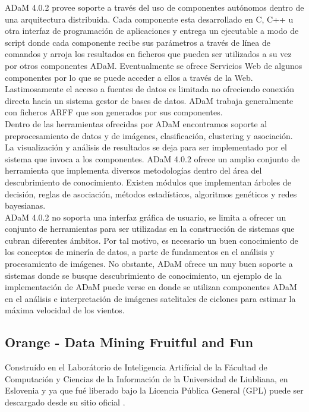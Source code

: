 ADaM 4.0.2 provee soporte a trav\'es del uso de componentes aut\'onomos dentro de una arquitectura distribuida. 
Cada componente esta desarrollado en C, C++ u otra interfaz de programaci\'on de aplicaciones y entrega un
ejecutable a modo de script donde cada componente recibe sus par\'ametros a trav\'es de l\'inea de comandos y
arroja los resultados en ficheros que pueden ser utilizados a su vez por otros componentes ADaM.  Eventualmente
se ofrece Servicios Web de algunos componentes por lo que se puede acceder a ellos a trav\'es de la Web.\\

Lastimosamente el acceso a fuentes de datos es limitada no ofreciendo conexi\'on directa hacia un sistema gestor
de bases de datos. ADaM trabaja generalmente con ficheros ARFF \cite{arff} que son generados por sus
componentes.\\

Dentro de las herramientas ofrecidas por ADaM encontramos soporte al preprocesamiento de datos y de im\'agenes,
clasificaci\'on, clustering y asociaci\'on.  La visualizaci\'on y an\'alisis de resultados se deja para ser 
implementado por el sistema que invoca a los componentes. ADaM 4.0.2 ofrece un amplio conjunto de herramienta que
implementa diversos metodolog\'ias dentro del \'area del descubrimiento de conocimiento.  Existen m\'odulos que
implementan \'arboles de decisi\'on, reglas de asociaci\'on, m\'etodos estad\'isticos, algoritmos gen\'eticos y
redes bayesianas.\\

ADaM 4.0.2 no soporta una interfaz gr\'afica de usuario, se limita a ofrecer un conjunto de herramientas para ser
utilizadas en la construcci\'on de sistemas que cubran diferentes \'ambitos.  Por tal motivo, es necesario un buen
conocimiento de los conceptos de miner\'ia de datos, a parte de fundamentos en el an\'alisis y procesamiento de
im\'agenes.  No obstante, ADaM ofrece un muy buen soporte a sistemas donde se busque descubrimiento de
conocimiento, un ejemplo de la implementaci\'on de ADaM puede verse en \cite{adamImpl} donde se utilizan
componentes ADaM en el an\'alisis e interpretaci\'on de im\'agenes satelitales de ciclones para estimar la
m\'axima velocidad de los vientos.

\subsection{Orange - Data Mining Fruitful and Fun}
Constru\'ido en el Labor\'atorio de Inteligencia Artif\'icial de la F\'acultad de Computaci\'on y Ciencias de la
Informaci\'on de la Universidad de Liubliana, en Eslovenia y ya que fu\'e liberado bajo la Licencia P\'ublica
General (GPL) puede ser descargado desde su sitio oficial \cite{oran}.\\

